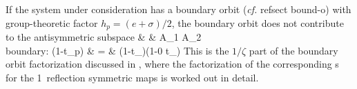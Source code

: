 {If the system under consideration has a boundary orbit
({\em cf.}  refsect {bound-o}) with
group-theoretic factor $h_p=(e+\sigma)/2$,
the boundary orbit does not contribute to the antisymmetric
subspace
\bea
& & \quad A_1 \quad \quad A_2   \nonumber\\
\mbox{boundary:} \quad (1-t_{p}) & = &
(1-t_{})(1-0 t_{})
\eea
This is the $1/\zeta$ part of the boundary orbit factorization
discussed in  , where the
factorization of the corresponding {\Fd s} for
the 1\dmn\ reflection symmetric maps is worked out in detail.
    } %
